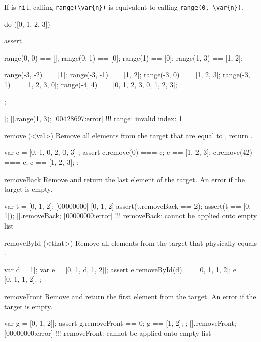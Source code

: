\begin{urbiscriptapi}
  If  is \lstinline|nil|, calling \lstinline|range(\var{n})|
  is equivalent to calling \lstinline|range(0, \var{n})|.

\begin{urbiscript}
do ([0, 1, 2, 3])
{
  assert
  {
    range(0, 0)   == [];
    range(0, 1)   == [0];
    range(1)      == [0];
    range(1, 3)   == [1, 2];

    range(-3, -2) == [1];
    range(-3, -1) == [1, 2];
    range(-3, 0)  == [1, 2, 3];
    range(-3, 1)  == [1, 2, 3, 0];
    range(-4, 4)  == [0, 1, 2, 3, 0, 1, 2, 3];
  };
}|;
[].range(1, 3);
[00428697:error] !!! range: invalid index: 1
\end{urbiscript}

\item[remove](<val>)%
  Remove all elements from the target that are equal to , return
  \this.

\begin{urbiscript}
var c = [0, 1, 0, 2, 0, 3]|;
assert
{
  c.remove(0) === c;   c ==  [1, 2, 3];
  c.remove(42) === c;  c ==  [1, 2, 3];
};
\end{urbiscript}

\item[removeBack]
  Remove and return the last element of the target. An error if the
  target is empty.

\begin{urbiscript}
var t = [0, 1, 2];
[00000000] [0, 1, 2]
assert(t.removeBack == 2);
assert(t == [0, 1]);
[].removeBack;
[00000000:error] !!! removeBack: cannot be applied onto empty list
\end{urbiscript}

\item[removeById](<that>)
  Remove all elements from the target that physically equals
  .

\begin{urbiscript}
var d = 1|;
var e = [0, 1, d, 1, 2]|;
assert
{
  e.removeById(d) == [0, 1, 1, 2];
  e == [0, 1, 1, 2];
};
\end{urbiscript}

\item[removeFront]
Remove and return the first element from the target. An error if the
target is empty.

\begin{urbiscript}
var g = [0, 1, 2]|;
assert
{
  g.removeFront == 0;
  g == [1, 2];
};
[].removeFront;
[00000000:error] !!! removeFront: cannot be applied onto empty list
\end{urbiscript}


\end{urbiscriptapi}
